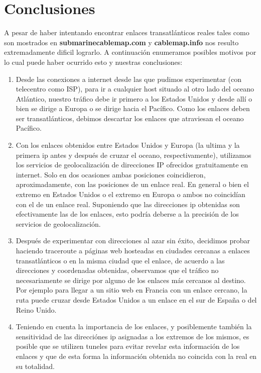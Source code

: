 \section{Conclusiones}


A pesar de haber intentando encontrar enlaces transatlánticos reales tales como son mostrados en \textbf{submarinecablemap.com} y \textbf{cablemap.info} nos resulto extremadamente dificil lograrlo. A continuación enumeramos posibles motivos por lo cual puede haber ocurrido esto y nuestras conclusiones:
\begin{enumerate}
\item	Desde las conexiones a internet desde las que pudimos experimentar (con telecentro como ISP), para ir a cualquier host situado al otro lado del oceano Atlántico, nuestro tráfico debe ir primero a los Estados Unidos y desde allí o bien se dirige a Europa o se dirige hacia el Pacífico. Como los enlaces deben ser transatlánticos, debimos descartar los enlaces que atraviesan el oceano Pacífico.
\item	Con los enlaces obtenidos entre Estados Unidos y Europa (la ultima y la primera ip antes y después de cruzar el oceano, respectivamente), utilizamos los servicios de geolocalización de direcciones IP ofrecidos gratuitamente en internet. Solo en dos ocasiones ambas posiciones coincidieron, aproximadamente, con las posiciones de un enlace real. En general o bien el extremo en Estados Unidos o el extremo en Europa o ambos no coincidían con el de un enlace real. Suponiendo que las direcciones ip obtenidas son efectivamente las de los enlaces, esto podría deberse a la precisión de los servicios de geolocalización.
\item	Después de experimentar con direcciones al azar sin éxito, decidimos probar haciendo traceroute a páginas web hosteadas en ciudades cercanas a enlaces transatlánticos o en la misma ciudad que el enlace, de acuerdo a las direcciones y coordenadas obtenidas, observamos que el tráfico no necesariamente se dirige por alguno de los enlaces más cercanos al destino. Por ejemplo para llegar a un sitio web en Francia con un enlace cercano, la ruta puede cruzar desde Estados Unidos a un enlace en el sur de España o del Reino Unido.
\item	Teniendo en cuenta la importancia de los enlaces, y posiblemente también la sensitividad de las direcciónes ip asignadas a los extremos de los mismos, es posible que se utilizen tuneles para evitar revelar esta información de los enlaces y que de esta forma la información obtenida no coincida con la real en su totalidad.
\end{enumerate}
